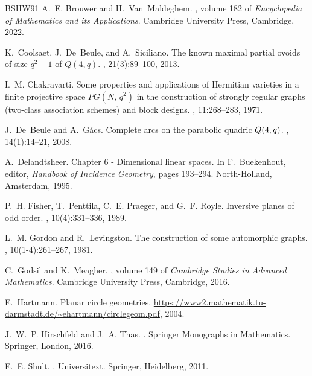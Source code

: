 \documentclass[a4paper]{article}
\theoremstyle{definition}
\begin{document}
\begin{thebibliography}{BSHW91}
A.~E. Brouwer and H.~Van~Maldeghem.
, volume 182 of {\em Encyclopedia of
  Mathematics and its Applications}.
\newblock Cambridge University Press, Cambridge, 2022.

K.~Coolsaet, J.~De~Beule, and A.~Siciliano.
\newblock The known maximal partial ovoids of size {$q^2-1$} of {$Q(4,q)$}.
, 21(3):89--100, 2013.

I.~M. Chakravarti.
\newblock Some properties and applications of {H}ermitian varieties in a finite
  projective space {$PG(N,\,q^{2})$} in the construction of strongly regular
  graphs (two-class association schemes) and block designs.
, 11:268--283, 1971.

J.~De~Beule and A.~G\'{a}cs.
\newblock Complete arcs on the parabolic quadric {${\rm Q}(4,q)$}.
, 14(1):14--21, 2008.

A.~Delandtsheer.
\newblock Chapter 6 - {D}imensional linear spaces.
\newblock In F.~Buekenhout, editor, {\em Handbook of Incidence Geometry}, pages
  193--294. North-Holland, Amsterdam, 1995.

P.~H. Fisher, T.~Penttila, C.~E. Praeger, and G.~F. Royle.
\newblock Inversive planes of odd order.
, 10(4):331--336, 1989.

L.~M. Gordon and R.~Levingston.
\newblock The construction of some automorphic graphs.
, 10(1-4):261--267, 1981.

C.~Godsil and K.~Meagher.
, volume
  149 of {\em Cambridge Studies in Advanced Mathematics}.
\newblock Cambridge University Press, Cambridge, 2016.

E.~Hartmann.
\newblock Planar circle geometries.
\newblock
  \url{https://www2.mathematik.tu-darmstadt.de/~ehartmann/circlegeom.pdf},
  2004.

J.~W.~P. Hirschfeld and J.~A. Thas.
.
\newblock Springer Monographs in Mathematics. Springer, London, 2016.

E.~E. Shult.
.
\newblock Universitext. Springer, Heidelberg, 2011.


\end{thebibliography}
\end{document}
